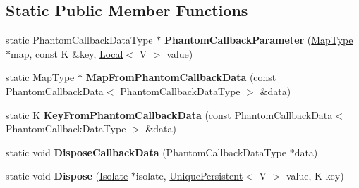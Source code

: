 \subsection*{Static Public Member Functions}
\begin{DoxyCompactItemize}
\item 
\hypertarget{classv8_1_1_default_phantom_persistent_value_map_traits_aa9865d00b04de4d777af48df24e68201}{}static Phantom\+Callback\+Data\+Type $\ast$ {\bfseries Phantom\+Callback\+Parameter} (\hyperlink{classv8_1_1_persistent_value_map}{Map\+Type} $\ast$map, const K \&key, \hyperlink{classv8_1_1_local}{Local}$<$ V $>$ value)\label{classv8_1_1_default_phantom_persistent_value_map_traits_aa9865d00b04de4d777af48df24e68201}

\item 
\hypertarget{classv8_1_1_default_phantom_persistent_value_map_traits_a4ce78b9dbfdf684c2b207abf5de025e3}{}static \hyperlink{classv8_1_1_persistent_value_map}{Map\+Type} $\ast$ {\bfseries Map\+From\+Phantom\+Callback\+Data} (const \hyperlink{classv8_1_1_phantom_callback_data}{Phantom\+Callback\+Data}$<$ Phantom\+Callback\+Data\+Type $>$ \&data)\label{classv8_1_1_default_phantom_persistent_value_map_traits_a4ce78b9dbfdf684c2b207abf5de025e3}

\item 
\hypertarget{classv8_1_1_default_phantom_persistent_value_map_traits_a8c5f1d18e22743974b27fce198307723}{}static K {\bfseries Key\+From\+Phantom\+Callback\+Data} (const \hyperlink{classv8_1_1_phantom_callback_data}{Phantom\+Callback\+Data}$<$ Phantom\+Callback\+Data\+Type $>$ \&data)\label{classv8_1_1_default_phantom_persistent_value_map_traits_a8c5f1d18e22743974b27fce198307723}

\item 
\hypertarget{classv8_1_1_default_phantom_persistent_value_map_traits_a5debfe0bae597c4dde9d23dbc42d0e9e}{}static void {\bfseries Dispose\+Callback\+Data} (Phantom\+Callback\+Data\+Type $\ast$data)\label{classv8_1_1_default_phantom_persistent_value_map_traits_a5debfe0bae597c4dde9d23dbc42d0e9e}

\item 
\hypertarget{classv8_1_1_default_phantom_persistent_value_map_traits_a1d24e09c410548251b11168e20af7feb}{}static void {\bfseries Dispose} (\hyperlink{classv8_1_1_isolate}{Isolate} $\ast$isolate, \hyperlink{classv8_1_1_unique_persistent}{Unique\+Persistent}$<$ V $>$ value, K key)\label{classv8_1_1_default_phantom_persistent_value_map_traits_a1d24e09c410548251b11168e20af7feb}

\end{DoxyCompactItemize}
